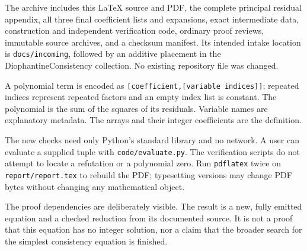 \documentclass[10pt,letterpaper]{article}
\theoremstyle{definition}\newtheorem{remark}[theorem]{Remark}
\begin{document}
The archive includes this LaTeX source and PDF, the complete principal
residual appendix, all three final coefficient lists and expansions,
exact intermediate data, construction and independent verification code,
ordinary proof reviews, immutable source archives, and a checksum manifest.
Its intended intake location is \nolinkurl{docs/incoming}, followed by an
additive placement in the DiophantineConsistency collection. No existing
repository file was changed.

A polynomial term is encoded as \texttt{[coefficient,[variable indices]]};
repeated indices represent repeated factors and an empty index list is
constant. The polynomial is the sum of the squares of its residuals.
Variable names are explanatory metadata. The arrays and their integer
coefficients are the definition.

The new checks need only Python's standard library and no network. A user
can evaluate a supplied tuple with \nolinkurl{code/evaluate.py}. The
verification scripts do not attempt to locate a refutation or a polynomial
zero. Run \texttt{pdflatex} twice on \nolinkurl{report/report.tex} to rebuild
the PDF; typesetting versions may change PDF bytes without changing any
mathematical object.

The proof dependencies are deliberately visible. The result is a new,
fully emitted equation and a checked reduction from its documented source.
It is not a proof that this equation has no integer solution, nor a claim
that the broader search for the simplest consistency equation is finished.
\end{document}
